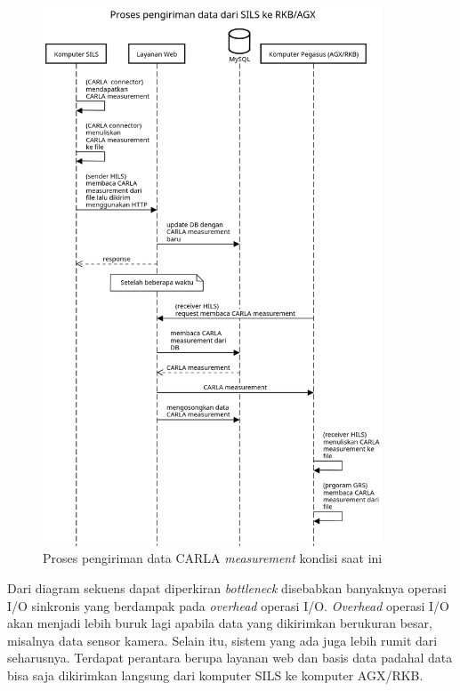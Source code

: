 \begin{figure}[!htbp]
	\centering
	\includegraphics[width=0.9\textwidth]{resources/chapter-3/sequence-diagram-old-hils-process.png}
	\caption{Proses pengiriman data CARLA \textit{measurement} kondisi saat ini}
	\label{chapter-3-sequence-diagram-old-hils}
\end{figure}

Dari diagram sekuens dapat diperkiran \textit{bottleneck} disebabkan
banyaknya operasi I/O sinkronis yang berdampak pada \textit{overhead} operasi
I/O. \textit{Overhead} operasi I/O akan menjadi lebih buruk lagi apabila data
yang dikirimkan berukuran besar, misalnya data sensor kamera. Selain itu, sistem
yang ada juga lebih rumit dari seharusnya. Terdapat perantara berupa layanan web
dan basis data padahal data bisa saja dikirimkan langsung dari komputer SILS ke
komputer AGX/RKB.

